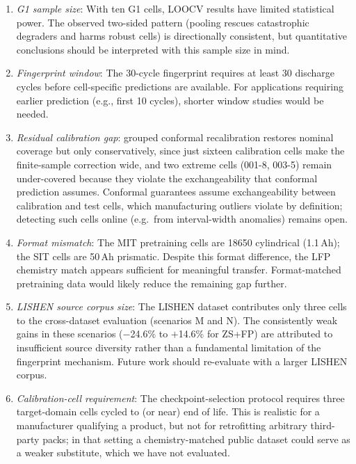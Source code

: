 \begin{enumerate}
  \item \textit{G1 sample size}: With ten G1 cells, LOOCV results have limited
        statistical power. The observed two-sided pattern (pooling rescues
        catastrophic degraders and harms robust cells) is directionally
        consistent, but quantitative conclusions should be interpreted with
        this sample size in mind.

  \item \textit{Fingerprint window}: The 30-cycle fingerprint requires at least
        30 discharge cycles before cell-specific predictions are available.
        For applications requiring earlier prediction (e.g., first 10 cycles),
        shorter window studies would be needed.

  \item \textit{Residual calibration gap}: grouped conformal recalibration
        restores nominal coverage but only conservatively, since just sixteen
        calibration cells make the finite-sample correction wide, and two extreme
        cells (001-8, 003-5) remain under-covered because they violate the
        exchangeability that conformal prediction assumes.
        Conformal guarantees assume exchangeability between calibration and
        test cells, which manufacturing outliers violate by definition;
        detecting such cells online (e.g.\ from interval-width anomalies)
        remains open.

  \item \textit{Format mismatch}: The MIT pretraining cells are 18650 cylindrical
        (1.1\,Ah); the SIT cells are 50\,Ah prismatic.
        Despite this format difference, the LFP chemistry match appears sufficient
        for meaningful transfer.
        Format-matched pretraining data would likely reduce the remaining gap further.

  \item \textit{LISHEN source corpus size}: The LISHEN dataset contributes only
        three cells to the cross-dataset evaluation (scenarios M and N).
        The consistently weak gains in these scenarios ($-$24.6\% to
        $+$14.6\% for ZS+FP) are attributed to insufficient source diversity
        rather than a fundamental limitation of the fingerprint mechanism.
        Future work should re-evaluate with a larger LISHEN corpus.

  \item \textit{Calibration-cell requirement}: The checkpoint-selection
        protocol requires three target-domain cells cycled to (or near) end of
        life. This is realistic for a manufacturer qualifying a product, but
        not for retrofitting arbitrary third-party packs; in that setting a
        chemistry-matched public dataset could serve as a weaker substitute,
        which we have not evaluated.


\end{enumerate}
